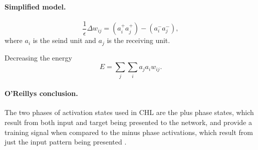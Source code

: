 \paragraph{Simplified model.}

$$\frac{1}{\epsilon}\Delta w_{ij} = (a_i^+a_j^+)-(a_i^-a_j^-),$$
where $a_i$ is the seind unit and $a_j$ is the receiving unit. 

Decreasing the energy
$$E = \sum_j\sum_i a_j a_i w_{ij}.$$

\paragraph{O'Reillys conclusion.}

The two phases of activation states used in CHL are the plus phase states, which result from both input
and target being presented to the network, and provide a training signal when compared to the minus phase
activations, which result from just the input pattern being presented \cite{o1996bio}. 

